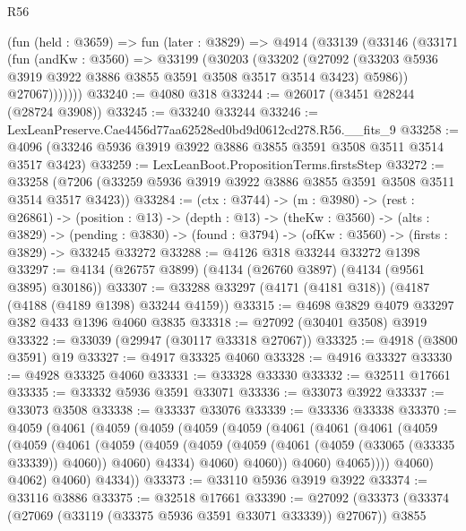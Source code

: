 \begin{lexlean}{R56}
\begin{coremodule}
      (fun (held : @3659) =>
      fun (later : @3829) =>
      @4914
        (@33139
          (@33146
            (@33171
              (fun (andKw : @3560) =>
              @33199
                (@30203
                  (@33202
                    (@27092
                      (@33203 @5936 @3919 @3922 @3886 @3855 @3591 @3508 @3517 @3514 @3423)
                      @5986))
                  @27067)))))))
@33240 := @4080 @318
@33244 := @26017 (@3451 @28244 (@28724 @3908))
@33245 := @33240 @33244
@33246 := LexLeanPreserve.Cae4456d77aa62528ed0bd9d0612cd278.R56.__fits_9
@33258 := @4096 (@33246 @5936 @3919 @3922 @3886 @3855 @3591 @3508 @3511 @3514 @3517 @3423)
@33259 := LexLeanBoot.PropositionTerms.firstsStep
@33272 := @33258 (@7206 (@33259 @5936 @3919 @3922 @3886 @3855 @3591 @3508 @3511 @3514 @3517 @3423))
@33284 := (ctx : @3744) ->
  (m : @3980) ->
  (rest : @26861) ->
  (position : @13) ->
  (depth : @13) ->
  (theKw : @3560) ->
  (alts : @3829) ->
  (pending : @3830) -> (found : @3794) -> (ofKw : @3560) -> (firsts : @3829) -> @33245 @33272
@33288 := @4126 @318 @33244 @33272 @1398
@33297 := @4134 (@26757 @3899) (@4134 (@26760 @3897) (@4134 (@9561 @3895) @30186))
@33307 := @33288 @33297 (@4171 (@4181 @318)) (@4187 (@4188 (@4189 @1398) @33244 @4159))
@33315 := @4698 @3829 @4079 @33297 @382 @433 @1396 @4060 @3835
@33318 := @27092 (@30401 @3508) @3919
@33322 := @33039 (@29947 (@30117 @33318 @27067))
@33325 := @4918 (@3800 @3591) @19
@33327 := @4917 @33325 @4060
@33328 := @4916 @33327
@33330 := @4928 @33325 @4060
@33331 := @33328 @33330
@33332 := @32511 @17661
@33335 := @33332 @5936 @3591 @33071
@33336 := @33073 @3922
@33337 := @33073 @3508
@33338 := @33337 @33076
@33339 := @33336 @33338
@33370 := @4059
    (@4061
      (@4059
        (@4059
          (@4059
            (@4059
              (@4061
                (@4061
                  (@4061
                    (@4059
                      (@4059
                        (@4061
                          (@4059
                            (@4059
                              (@4059
                                (@4059 (@4061 (@4059 (@33065 (@33335 @33339)) @4060)) @4060)
                                @4334)
                              @4060)
                            @4060))
                        @4060)
                      @4065))))
              @4060)
            @4062)
          @4060)
        @4334))
@33373 := @33110 @5936 @3919 @3922
@33374 := @33116 @3886
@33375 := @32518 @17661
@33390 := @27092
    (@33373
      (@33374 (@27069 (@33119 (@33375 @5936 @3591 @33071 @33339)) @27067))
      @3855

\end{coremodule}
\end{lexlean}
